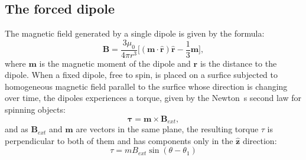 \subsection{The forced dipole}
The magnetic field generated by a single dipole is given by the formula: 
\begin{equation}
    \boldsymbol{B} = \dfrac{3\mu_0}{4 \pi r^3}\bigg[ (\boldsymbol{m \cdot \hat{r}})\boldsymbol{\hat{r}} - \dfrac{1}{3}\boldsymbol{m} \bigg],
    \label{eq:MagneticFieldDipole}
\end{equation}
where $\boldsymbol{m}$ is the magnetic moment of the dipole and $\boldsymbol{r}$ is the distance to the dipole. 
When a fixed dipole, free to spin, is placed on a surfice subjected to homogeneous magnetic field parallel to the surfice whose direction is changing over time, the dipoles experiences a torque, given by the Newton\textquotesingle~s second law for spinning objects: 
\begin{equation}
    \boldsymbol{\tau} = \boldsymbol{m} \times \boldsymbol{B}_{ext},
    \label{eq:NewtonSecondLaw}
\end{equation}
and as $\boldsymbol{B}_{ext}$ and $\boldsymbol{m}$ are vectors in the same plane, the resulting torque $\tau$ is perpendicular to both of them and has components only in the $\boldsymbol{\hat{z}}$ direction: 
\begin{equation}
        \tau = mB_{ext} \sin(\theta - \theta_1)
        \label{eq:SingleDipoleEquation}
\end{equation}



